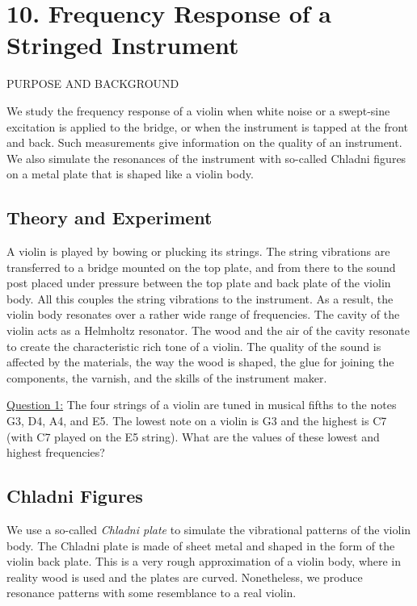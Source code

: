 \documentclass[11pt]{NSF}
\begin{document}
\section{10. Frequency Response of a Stringed Instrument}

PURPOSE AND BACKGROUND

We study the frequency response of a violin when white noise or a
swept-sine excitation is applied to the bridge, or when the 
instrument is tapped at the front and back. 
Such measurements give information on the quality of an
instrument. We also simulate the resonances of the instrument with
so-called Chladni figures on a metal plate that is shaped like a
violin body.


\subsection{Theory and Experiment}

A violin is played by bowing or plucking its strings. The string
vibrations are transferred to a bridge mounted on the top plate, and
from there to the sound post placed under pressure between the top
plate and back plate of the violin body. All this couples the string
vibrations to the instrument. As a result, the violin body resonates
over a rather wide range of frequencies. The cavity of the violin acts as a
Helmholtz resonator. The wood and the air of the cavity resonate to
create the characteristic rich tone of a violin. The quality of the
sound is affected by the materials, the way the wood is shaped, the
glue for joining the components, the varnish, and the skills of the
instrument maker.

\underline{Question 1:}
The four strings of a violin are tuned in musical fifths to the
notes G3, D4, A4, and E5. 
The lowest note on a violin is G3 and the highest is C7 
(with C7 played on the E5 string). 
What are the values of these lowest and highest frequencies? \\


\subsection{Chladni Figures}

We use a so-called {\em Chladni plate} to simulate the vibrational patterns
of the violin body. The Chladni plate is made of sheet metal and
shaped in the form of the violin back plate. This is a very rough
approximation of a violin body, where in reality wood is used and the
plates are curved. Nonetheless, we produce resonance patterns with
some resemblance to a real violin.
\end{document}
